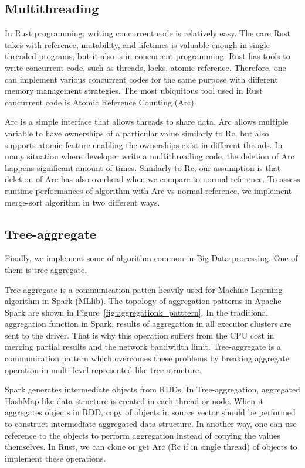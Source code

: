 \subsection{Multithreading}
\label{sec:history}
In Rust programming, writing concurrent code is relatively easy. The care Rust takes with reference, mutability, and lifetimes is valuable enough in single-threaded programs, 
but it also is in concurrent programming. Rust has tools to write concurrent code, such as threads, locks, atomic reference. 
Therefore, one can implement various concurrent codes for the same purpose with different memory management strategies. 
The most ubiquitous tool used in Rust concurrent code is Atomic Reference Counting (Arc). 

Arc is a simple interface that allows threads to share data. Arc allows multiple variable to have ownerships of a particular value similarly to Rc, 
but also supports atomic feature enabling the ownerships exist in different threads. 
In many situation where developer write a multithreading code, the deletion of Arc happens significant amount of times. 
Similarly to Rc, our assumption is that deletion of Arc has also overhead when we compare to normal reference. 
To assess runtime performances of algorithm with Arc vs normal reference, we implement merge-sort algorithm in two different ways. 

\subsection{Tree-aggregate}
\label{sec:history}
Finally, we implement some of algorithm common in Big Data processing. One of them is tree-aggregate.

Tree-aggregate is a communication patten heavily used for Machine Learning algorithm in Spark (MLlib). 
The topology of aggregation patterns in Apache Spark are shown in Figure~\ref{fig:aggregationk_patttern}. 
In the traditional aggregation function in Spark, results of aggregation in all executor clusters are sent to the driver. 
That is why this operation suffers from the CPU cost in merging partial results and the network bandwidth limit.
Tree-aggregate is a communication pattern which overcomes these problems by breaking aggregate operation in multi-level represented like tree structure.

Spark generates intermediate objects from RDDs. In Tree-aggregation, aggregated HashMap like data structure is created in each thread or node. 
When it aggregates objects in RDD, copy of objects in source vector should be performed to construct intermediate aggregated data structure.
In another way, one can use reference to the objects to perform aggregation instead of copying the values themselves.
In Rust, we can clone or get Arc (Rc if in single thread) of objects to implement these operations.


